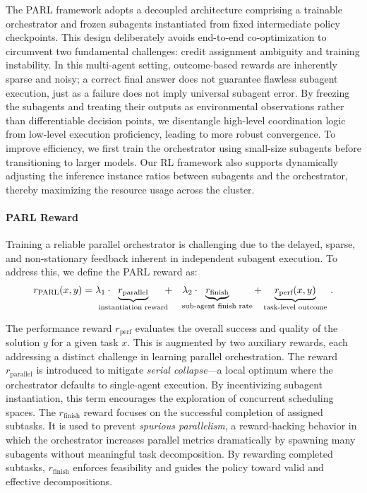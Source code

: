 The PARL framework adopts a decoupled architecture comprising a trainable orchestrator and frozen subagents instantiated from fixed intermediate policy checkpoints. This design deliberately avoids end-to-end co-optimization to circumvent two fundamental challenges: credit assignment ambiguity and training instability. 
In this multi-agent setting, outcome-based rewards are inherently sparse and noisy; a correct final answer does not guarantee flawless subagent execution, just as a failure does not imply universal subagent error. 
By freezing the subagents and treating their outputs as environmental observations rather than differentiable decision points, we disentangle high-level coordination logic from low-level execution proficiency, 
 leading to more robust convergence.
To improve efficiency, we first train the orchestrator using small-size subagents before transitioning to larger models.
Our RL framework also supports dynamically adjusting the inference instance ratios between subagents and the orchestrator, thereby maximizing the resource usage across the cluster.


\paragraph{PARL Reward}
Training a reliable parallel orchestrator is challenging due to the delayed, sparse, and non-stationary feedback inherent in independent subagent execution. To address this, we define the PARL reward as:
\begin{align*}
r_{\mathrm{PARL}}(x, y) = \lambda_1 \cdot \mspace{-26mu} \underbrace{r_{\text{parallel}}}_{\text{instantiation reward}} \mspace{-9mu} + \mspace{18mu}\lambda_2 \cdot \mspace{-32mu}\underbrace{r_{\text{finish}}}_{\text{sub-agent finish rate}} + 
\underbrace{r_{\text{perf}}(x, y)}_{\text{task-level outcome}}
\, .
\end{align*}

The performance reward $r_{\text{perf}}$ evaluates the overall success and quality of the solution $y$ for a given task $x$. This is augmented by two auxiliary rewards, each addressing a distinct challenge in learning parallel orchestration. The reward $r_{\text{parallel}}$ is introduced to mitigate \emph{serial collapse}—a local optimum where the orchestrator defaults to single-agent execution. By incentivizing subagent instantiation, this term encourages the exploration of concurrent scheduling spaces. The $r_{\text{finish}}$ reward focuses on the successful completion of assigned subtasks. It is used to prevent \emph{spurious parallelism}, a reward-hacking behavior in which the orchestrator increases parallel metrics dramatically by spawning many subagents without meaningful task decomposition. By rewarding completed subtasks, $r_{\text{finish}}$ enforces feasibility and guides the policy toward valid and effective decompositions.

